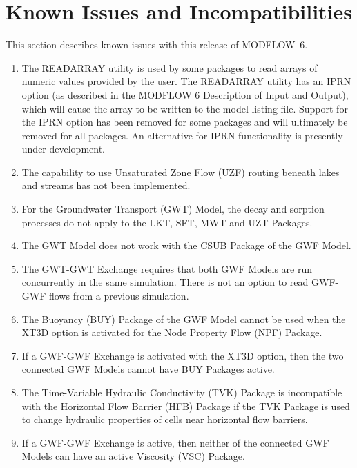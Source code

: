 \documentclass[11pt,twoside,twocolumn]{usgsreport}
\begin{document}
\section{Known Issues and Incompatibilities}
This section describes known issues with this release of MODFLOW~6.  

\begin{enumerate}

\item
The READARRAY utility is used by some packages to read arrays of numeric values provided by the user.  The READARRAY utility has an IPRN option (as described in the MODFLOW 6 Description of Input and Output), which will cause the array to be written to the model listing file.  Support for the IPRN option has been removed for some packages and will ultimately be removed for all packages.  An alternative for IPRN functionality is presently under development.

\item
The capability to use Unsaturated Zone Flow (UZF) routing beneath lakes and streams has not been implemented.

\item
For the Groundwater Transport (GWT) Model, the decay and sorption processes do not apply to the LKT, SFT, MWT and UZT Packages.

\item
The GWT Model does not work with the CSUB Package of the GWF Model.  

\item
The GWT-GWT Exchange requires that both GWF Models are run concurrently in the same simulation.  There is not an option to read GWF-GWF flows from a previous simulation.

\item
The Buoyancy (BUY) Package of the GWF Model cannot be used when the XT3D option is activated for the Node Property Flow (NPF) Package.

\item
If a GWF-GWF Exchange is activated with the XT3D option, then the two connected GWF Models cannot have BUY Packages active.

\item
The Time-Variable Hydraulic Conductivity (TVK) Package is incompatible with the Horizontal Flow Barrier (HFB) Package if the TVK Package is used to change hydraulic properties of cells near horizontal flow barriers.

\item
If a GWF-GWF Exchange is active, then neither of the connected GWF Models can have an active Viscosity (VSC) Package.

\end{enumerate}
\end{document}
